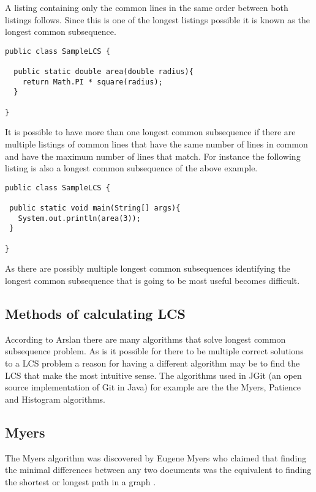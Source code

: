 A listing containing only the common lines in the same order between both listings follows.  Since this is one of the longest listings possible it is known as the longest common subsequence.  

\begin{lstlisting}
public class SampleLCS { 

  public static double area(double radius){
    return Math.PI * square(radius);
  }
  
}

\end{lstlisting}

It is possible to have more than one longest common subsequence if there are multiple listings of common lines that have the same number of lines in common and have the maximum number of lines that match.  For instance the following listing is also a longest common subsequence of the above example.

\begin{lstlisting}
public class SampleLCS {

 public static void main(String[] args){
   System.out.println(area(3));
 }
 
}
\end{lstlisting}

As there are possibly multiple longest common subsequences identifying the longest common subsequence that is going to be most useful becomes difficult.

\subsection{Methods of calculating LCS}
According to Arslan \cite{Arslan2010} there are many algorithms that solve longest common subsequence problem. As is it possible for there to be multiple correct solutions to a LCS problem a reason for having a different algorithm may be to find the LCS that make the most intuitive sense. The algorithms used in JGit (an open source implementation of Git in Java) for example are the the Myers, Patience and Histogram algorithms.

\subsection{Myers}
The Myers algorithm was discovered by Eugene Myers who claimed that finding the minimal differences between any two documents was the equivalent to finding the shortest or longest path in a graph \cite{Myers1986}.


